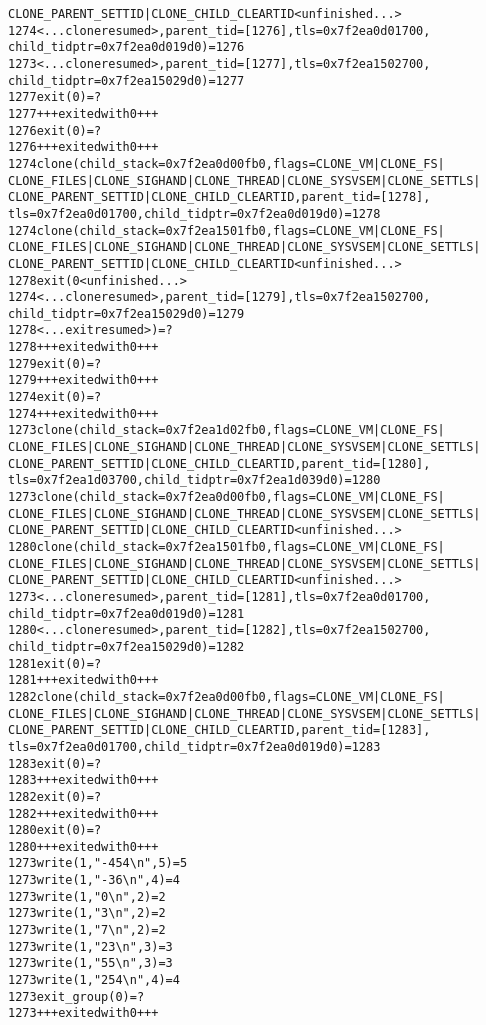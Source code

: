 \documentclass[pdf, unicode, 12pt, a4paper,oneside,fleqn]{article}
\begin{document}
\begin{alltt}
CLONE_PARENT_SETTID|CLONE_CHILD_CLEARTID <unfinished ...>
1274  <... clone resumed>, parent_tid=[1276], tls=0x7f2ea0d01700, 
child_tidptr=0x7f2ea0d019d0) = 1276
1273  <... clone resumed>, parent_tid=[1277], tls=0x7f2ea1502700, 
child_tidptr=0x7f2ea15029d0) = 1277
1277  exit(0)                           = ?
1277  +++ exited with 0 +++
1276  exit(0)                           = ?
1276  +++ exited with 0 +++
1274  clone(child_stack=0x7f2ea0d00fb0, flags=CLONE_VM|CLONE_FS|
CLONE_FILES|CLONE_SIGHAND|CLONE_THREAD|CLONE_SYSVSEM|CLONE_SETTLS|
CLONE_PARENT_SETTID|CLONE_CHILD_CLEARTID, parent_tid=[1278], 
tls=0x7f2ea0d01700, child_tidptr=0x7f2ea0d019d0) = 1278
1274  clone(child_stack=0x7f2ea1501fb0, flags=CLONE_VM|CLONE_FS|
CLONE_FILES|CLONE_SIGHAND|CLONE_THREAD|CLONE_SYSVSEM|CLONE_SETTLS|
CLONE_PARENT_SETTID|CLONE_CHILD_CLEARTID <unfinished ...>
1278  exit(0 <unfinished ...>
1274  <... clone resumed>, parent_tid=[1279], tls=0x7f2ea1502700, 
child_tidptr=0x7f2ea15029d0) = 1279
1278  <... exit resumed>)               = ?
1278  +++ exited with 0 +++
1279  exit(0)                           = ?
1279  +++ exited with 0 +++
1274  exit(0)                           = ?
1274  +++ exited with 0 +++
1273  clone(child_stack=0x7f2ea1d02fb0, flags=CLONE_VM|CLONE_FS|
CLONE_FILES|CLONE_SIGHAND|CLONE_THREAD|CLONE_SYSVSEM|CLONE_SETTLS|
CLONE_PARENT_SETTID|CLONE_CHILD_CLEARTID, parent_tid=[1280], 
tls=0x7f2ea1d03700, child_tidptr=0x7f2ea1d039d0) = 1280
1273  clone(child_stack=0x7f2ea0d00fb0, flags=CLONE_VM|CLONE_FS|
CLONE_FILES|CLONE_SIGHAND|CLONE_THREAD|CLONE_SYSVSEM|CLONE_SETTLS|
CLONE_PARENT_SETTID|CLONE_CHILD_CLEARTID <unfinished ...>
1280  clone(child_stack=0x7f2ea1501fb0, flags=CLONE_VM|CLONE_FS|
CLONE_FILES|CLONE_SIGHAND|CLONE_THREAD|CLONE_SYSVSEM|CLONE_SETTLS|
CLONE_PARENT_SETTID|CLONE_CHILD_CLEARTID <unfinished ...>
1273  <... clone resumed>, parent_tid=[1281], tls=0x7f2ea0d01700, 
child_tidptr=0x7f2ea0d019d0) = 1281
1280  <... clone resumed>, parent_tid=[1282], tls=0x7f2ea1502700, 
child_tidptr=0x7f2ea15029d0) = 1282
1281  exit(0)                           = ?
1281  +++ exited with 0 +++
1282  clone(child_stack=0x7f2ea0d00fb0, flags=CLONE_VM|CLONE_FS|
CLONE_FILES|CLONE_SIGHAND|CLONE_THREAD|CLONE_SYSVSEM|CLONE_SETTLS|
CLONE_PARENT_SETTID|CLONE_CHILD_CLEARTID, parent_tid=[1283], 
tls=0x7f2ea0d01700, child_tidptr=0x7f2ea0d019d0) = 1283
1283  exit(0)                           = ?
1283  +++ exited with 0 +++
1282  exit(0)                           = ?
1282  +++ exited with 0 +++
1280  exit(0)                           = ?
1280  +++ exited with 0 +++
1273  write(1, "-454\textbackslash{n}", 5)             = 5
1273  write(1, "-36\textbackslash{n}", 4)              = 4
1273  write(1, "0\textbackslash{n}", 2)                = 2
1273  write(1, "3\textbackslash{n}", 2)                = 2
1273  write(1, "7\textbackslash{n}", 2)                = 2
1273  write(1, "23\textbackslash{n}", 3)               = 3
1273  write(1, "55\textbackslash{n}", 3)               = 3
1273  write(1, "254\textbackslash{n}", 4)              = 4
1273  exit_group(0)                     = ?
1273  +++ exited with 0 +++
\end{alltt}
\end{document}
